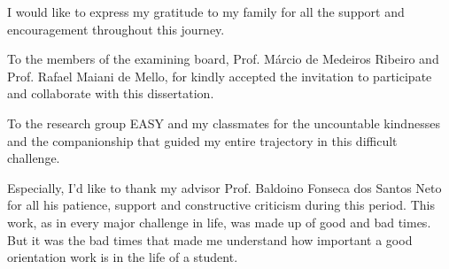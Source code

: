 I would like to express my gratitude to my family for all the support and encouragement throughout this journey.

To the members of the examining board, Prof. Márcio de Medeiros Ribeiro and Prof. Rafael Maiani de Mello, for kindly accepted the invitation to participate and collaborate with this dissertation.

To the research group EASY and my classmates for the uncountable kindnesses and the companionship that guided my entire trajectory in this difficult challenge.

Especially, I'd like to thank my advisor Prof. Baldoino Fonseca dos Santos Neto for all his patience, support and constructive criticism during this period. This work, as in every major challenge in life, was made up of good and bad times. But it was the bad times that made me understand how important a good orientation work is in the life of a student.



